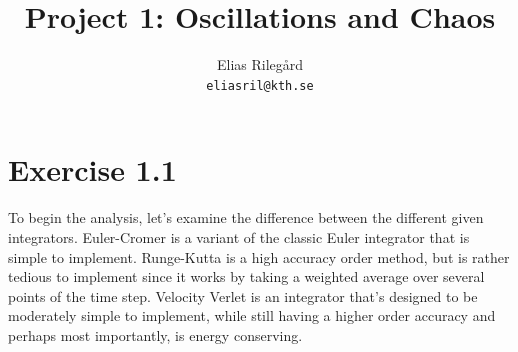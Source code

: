 \documentclass[a4paper,12pt]{article}
\title{Project 1: Oscillations and Chaos}
\author{
  Elias Rilegård\\
  \texttt{eliasril@kth.se}
}
\begin{document}
\maketitle

\section*{Exercise 1.1}

To begin the analysis, let's examine the difference between the different given integrators.
Euler-Cromer is a variant of the classic Euler integrator that is simple to implement.
Runge-Kutta is a high accuracy order method, but is rather tedious to implement since it works
by taking a weighted average over several points of the time step.
Velocity Verlet is an integrator that's designed to be moderately simple to implement, while
still having a higher order accuracy and perhaps most importantly, is energy conserving.
\end{document}
